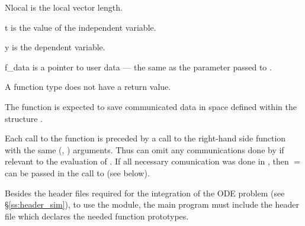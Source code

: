 {
  \begin{args}[Nlocal]
  \item[Nlocal] 
    is the local vector length.
  \item[t]
    is the value of the independent variable.
  \item[y]
    is the dependent variable. 
  \item[f\_data]
    is a pointer to user data --- the same as the       
    parameter passed to .  
  \end{args}
}
{
  A  function type does not have a return value.
}
{
  The  function is expected to save communicated data in space defined
  within the structure . 

  Each call to the  function is preceded by a call to the right-hand side
  function  with the same (, ) arguments.  Thus  can omit 
  any communications done by  if relevant to the evaluation of .
  If all necessary comunication was done in , then  $=$ 
  can be passed in the call to  (see below).
}

Besides the header files required for the integration of the ODE problem
(see \S\ref{ss:header_sim}),  to use the {\cvbbdpre} module, the main program 
must include the header file  which declares the needed
function prototypes.

